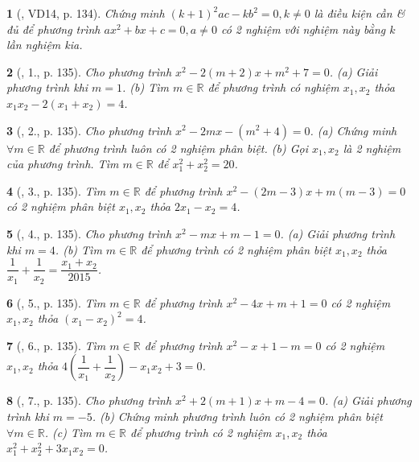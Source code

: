 \documentclass{article}
\newtheorem{baitoan}{}
\begin{document}
\begin{baitoan}[\cite{Thu_Viet_Minh_ptb2}, VD14, p. 134]
	Chứng minh $(k + 1)^2ac - kb^2 = 0,k\ne0$ là điều kiện cần \& đủ để phương trình $ax^2 + bx + c = 0,a\ne0$ có 2 nghiệm với nghiệm này bằng $k$ lần nghiệm kia.
\end{baitoan}

\begin{baitoan}[\cite{Thu_Viet_Minh_ptb2}, 1., p. 135]
	Cho phương trình $x^2 - 2(m + 2)x + m^2 + 7 = 0$. (a) Giải phương trình khi $m = 1$. (b) Tìm $m\in\mathbb{R}$ để phương trình có nghiệm $x_1,x_2$ thỏa $x_1x_2 - 2(x_1 + x_2) = 4$.
\end{baitoan}

\begin{baitoan}[\cite{Thu_Viet_Minh_ptb2}, 2., p. 135]
	Cho phương trình $x^2 - 2mx - (m^2 + 4) = 0$. (a) Chứng minh $\forall m\in\mathbb{R}$ để phương trình luôn có 2 nghiệm phân biệt. (b) Gọi $x_1,x_2$ là 2 nghiệm của phương trình. Tìm $m\in\mathbb{R}$ để $x_1^2 + x_2^2 = 20$.
\end{baitoan}

\begin{baitoan}[\cite{Thu_Viet_Minh_ptb2}, 3., p. 135]
	Tìm $m\in\mathbb{R}$ để phương trình $x^2 - (2m - 3)x + m(m - 3) = 0$ có 2 nghiệm phân biệt $x_1,x_2$ thỏa $2x_1 - x_2 = 4$.
\end{baitoan}

\begin{baitoan}[\cite{Thu_Viet_Minh_ptb2}, 4., p. 135]
	Cho phương trình $x^2 - mx + m - 1 = 0$. (a) Giải phương trình khi $m = 4$. (b) Tìm $m\in\mathbb{R}$ để phương trình có 2 nghiệm phân biệt $x_1,x_2$ thỏa $\dfrac{1}{x_1} + \dfrac{1}{x_2} = \dfrac{x_1 + x_2}{2015}$.
\end{baitoan}

\begin{baitoan}[\cite{Thu_Viet_Minh_ptb2}, 5., p. 135]
	Tìm $m\in\mathbb{R}$ để phương trình $x^2 - 4x + m + 1 = 0$ có 2 nghiệm $x_1,x_2$ thỏa $(x_1 - x_2)^2 = 4$.
\end{baitoan}

\begin{baitoan}[\cite{Thu_Viet_Minh_ptb2}, 6., p. 135]
	Tìm $m\in\mathbb{R}$ để phương trình $x^2 - x + 1 - m = 0$ có 2 nghiệm $x_1,x_2$ thỏa $4\left(\dfrac{1}{x_1} + \dfrac{1}{x_2}\right) - x_1x_2 + 3 = 0$.
\end{baitoan}

\begin{baitoan}[\cite{Thu_Viet_Minh_ptb2}, 7., p. 135]
	Cho phương trình $x^2 + 2(m + 1)x + m - 4 = 0$. (a) Giải phương trình khi $m = -5$. (b) Chứng minh phương trình luôn có 2 nghiệm phân biệt $\forall m\in\mathbb{R}$. (c) Tìm $m\in\mathbb{R}$ để phương trình có 2 nghiệm $x_1,x_2$ thỏa $x_1^2 + x_2^2 + 3x_1x_2 = 0$.
\end{baitoan}
\end{document}

